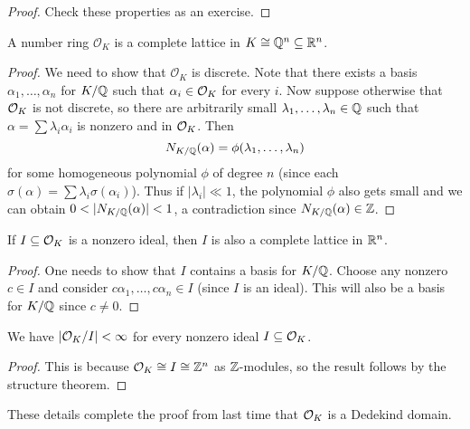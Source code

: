 \begin{proof}
  Check these properties as an exercise.
\end{proof}

\begin{theorem}
  A number ring $\mathcal{O}_K$ is a complete
  lattice in $K \cong \mathbb{Q}^n \subseteq \mathbb{R}^n$.
\end{theorem}

\begin{proof}
  We need to show that $\mathcal{O}_K$ is discrete.
  Note that there exists a basis $\alpha_1, \dots, \alpha_n$
  for $K / \mathbb{Q}$ such that $\alpha_i \in \mathcal{O}_K$
  for every $i$.
  Now suppose otherwise that $\mathcal{O}_K$ is not discrete,
  so there
  are arbitrarily small $\lambda_1, \dots, \lambda_n \in \mathbb{Q}$
  such that $\alpha = \sum \lambda_i \alpha_i$
  is nonzero and in $\mathcal{O}_K$. Then
  \[
    N_{K / \mathbb{Q}}(\alpha)
    = \phi(\lambda_1, \dots, \lambda_n)
  \]
  for some homogeneous polynomial $\phi$ of
  degree $n$ (since each
  $\sigma(\alpha) = \sum \lambda_i \sigma(\alpha_i)$).
  Thus if $|\lambda_i| \ll 1$, the polynomial
  $\phi$ also gets small and we can obtain
  $0 < |N_{K / \mathbb{Q}}(\alpha)| < 1$, a contradiction
  since $N_{K / \mathbb{Q}}(\alpha) \in \mathbb{Z}$.
\end{proof}

\begin{corollary}
  If $I \subseteq \mathcal{O}_K$ is a nonzero ideal, then
  $I$ is also a complete lattice in $\mathbb{R}^n$.
\end{corollary}

\begin{proof}
  One needs to show that $I$ contains a basis for
  $K / \mathbb{Q}$. Choose any nonzero $c \in I$ and consider
  $c \alpha_1, \dots, c \alpha_n \in I$ (since $I$
  is an ideal). This will also be a basis for
  $K / \mathbb{Q}$ since $c \ne 0$.
\end{proof}

\begin{corollary}
  We have $|\mathcal{O}_K / I| < \infty$ for every
  nonzero ideal $I \subseteq \mathcal{O}_K$.
\end{corollary}

\begin{proof}
  This is because $\mathcal{O}_K \cong I \cong \mathbb{Z}^n$
  as $\mathbb{Z}$-modules, so the result follows by the
  structure theorem.
\end{proof}

\begin{remark}
  These details complete the proof from last time that
  $\mathcal{O}_K$ is a Dedekind domain.
\end{remark}

